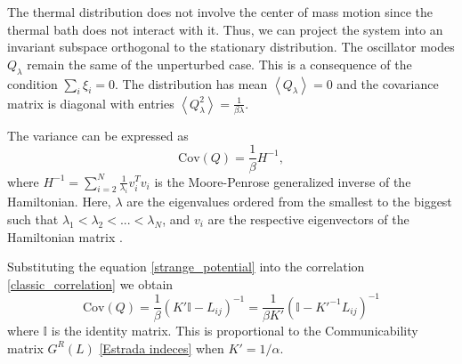 The thermal distribution does not involve the center of mass motion since the thermal bath does not interact with it. Thus, we can project the system into an invariant subspace orthogonal to the stationary distribution. The oscillator modes $Q_\lambda$ remain the same of the unperturbed case. 
This is a consequence of the condition $\sum_i \xi_i = 0$.
The distribution has mean $\left<Q_\lambda\right>= 0$ and the covariance matrix is diagonal with entries $\left<Q^2_\lambda\right>= \frac{1}{\beta \lambda}$.

The variance can be expressed as
\begin{equation}\label{classic_correlation}
    \mathrm{Cov}(Q) = \frac{1}{\beta}H^{-1},
\end{equation}
where ${H}^{-1} = \sum_{i=2}^N \frac{1}{\lambda_i}v_i^Tv_i$ is the Moore-Penrose generalized inverse of the Hamiltonian. Here, $\lambda$ are the eigenvalues ordered from the smallest to the biggest such that $\lambda_1 < \lambda_2 < ... < \lambda_N$, and $v_i$ are the respective eigenvectors of the Hamiltonian matrix \cite{Generalized_inverse_Laplacian}.

Substituting the equation \eqref{strange_potential} into the correlation \eqref{classic_correlation} we obtain
\begin{equation}
    \mathrm{Cov}(Q) = \frac{1}{\beta}\left(K'\mathbb{I} - L_{ij}\right)^{-1} = \frac{1}{\beta K'}\left(\mathbb{I} - K'^{-1}L_{ij}\right)^{-1}
\end{equation}
where $\mathbb{I}$ is the identity matrix.
This is proportional to the Communicability matrix $G^R(L)$ \eqref{Estrada indeces} when $K' = 1/\alpha$.

